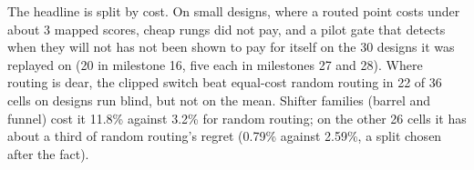 \documentclass[conference]{IEEEtran}
\begin{document}
The headline is split by cost. On small designs, where a routed point
costs under about 3 mapped scores, cheap rungs did not pay, and a pilot
gate that detects when they will not has not been shown to pay for
itself on the 30 designs it was replayed on (20 in milestone 16, five
each in milestones 27 and 28). Where routing is dear, the clipped switch
beat equal-cost random routing in 22 of 36 cells on designs run blind,
but not on the mean. Shifter families (barrel and funnel) cost it 11.8\%
against 3.2\% for random routing; on the other 26 cells it has about a
third of random routing's regret (0.79\% against 2.59\%, a split chosen
after the fact).


\end{document}
